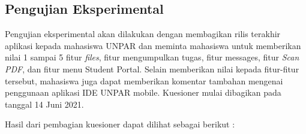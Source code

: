 \subsection{Pengujian Eksperimental}

Pengujian eksperimental akan dilakukan dengan membagikan rilis terakhir aplikasi kepada mahasiswa UNPAR dan meminta mahasiswa untuk memberikan nilai 1 sampai 5 fitur \textit{files}, fitur mengumpulkan tugas, fitur messages, fitur \textit{Scan PDF}, dan fitur menu Student Portal. Selain memberikan nilai kepada fitur-fitur tersebut, mahasiswa juga dapat memberikan komentar tambahan mengenai penggunaan aplikasi IDE UNPAR mobile. Kuesioner mulai dibagikan pada tanggal 14 Juni 2021. 

Hasil dari pembagian kuesioner dapat dilihat sebagai berikut :

